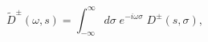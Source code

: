 \begin{equation} 
\label{ksy1} 
\tilde{D}^{\pm}(\omega , s)= 
\int _{-\infty}^{\infty} d\sigma \; 
e^{-i\omega \sigma}\; D^{\pm}(s,\sigma), 
\end{equation} 
